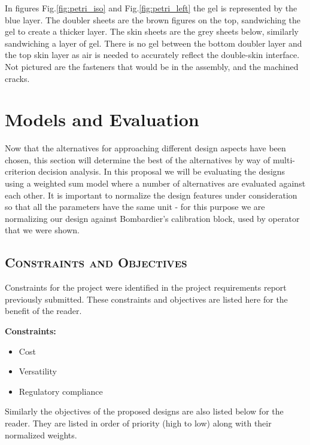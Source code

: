 \documentclass[12pt]{article}
\begin{document}
In figures Fig.\ref{fig:petri_iso} and Fig.\ref{fig:petri_left} the gel is represented by the blue layer. The doubler sheets are the brown figures on the top, sandwiching the gel to create a thicker layer. The skin sheets are the grey sheets below, similarly sandwiching a layer of gel. There is no gel between the bottom doubler layer and the top skin layer as air is needed to accurately reflect the double-skin interface. Not pictured are the fasteners that would be in the assembly, and the machined cracks.
\clearpage

\section{Models and Evaluation}
Now that the alternatives for approaching different design aspects have been chosen, this section will determine the best of the alternatives by way of multi-criterion decision analysis. In this proposal we will be evaluating the designs using a weighted sum model where a number of alternatives are evaluated against each other. It is important to normalize the design features under consideration so that all the parameters have the same unit - for this purpose we are normalizing our design against Bombardier's calibration block, used by operator that we were shown. 

\subsection{\textsc{Constraints and Objectives}}

Constraints for the project were identified in the project requirements report previously submitted. These constraints and objectives are listed here for the benefit of the reader.

\textbf{Constraints:}
\begin{itemize}
\item Cost
\item Versatility
\item Regulatory compliance
\end{itemize}

Similarly the objectives of the proposed designs are also listed below for the reader. They are listed in order of priority (high to low) along with their normalized weights.
\end{document}
